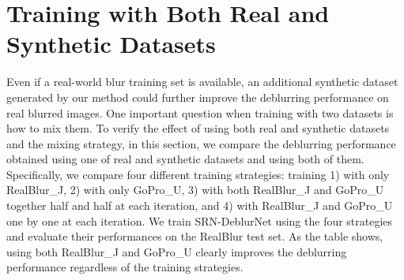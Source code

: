 \setlength{\tabcolsep}{7pt}
\begin{table}[t]
\centering
\caption{Comparison among different blur synthesis methods. We compute PSNR, SSIM and KL-divergence (KLD) from synthesized and real blurred images.}
\label{tbl:additional_metrics}
\end{table}



\section{Training with Both Real and Synthetic Datasets}


Even if a real-world blur training set is available, an additional synthetic dataset generated by our method could further improve the deblurring performance on real blurred images.
One important question when training with two datasets is how to mix them.
To verify the effect of using both real and synthetic datasets and the mixing strategy, in this section, we compare the deblurring performance obtained using one of real and synthetic datasets and using both of them.
Specifically, we compare four different training strategies: training 1) with only RealBlur\_J, 2) with only GoPro\_U, 3) with both RealBlur\_J and GoPro\_U together half and half at each iteration, and 4) with RealBlur\_J and GoPro\_U one by one at each iteration.
We train SRN-DeblurNet using the four strategies and evaluate their performances on the RealBlur test set.
As the table shows, using both RealBlur\_J and GoPro\_U clearly improves the deblurring performance regardless of the training strategies.


